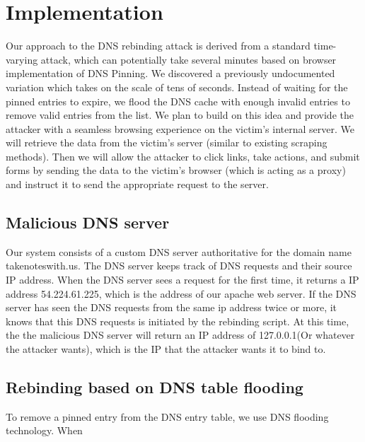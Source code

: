 \section{Implementation}
\label{sec:impl}

Our approach to the DNS rebinding attack is derived from a standard time-varying attack, which can potentially take several minutes based on browser implementation of DNS Pinning. We discovered a previously undocumented variation which takes on the scale of tens of seconds. Instead of waiting for the pinned entries to expire, we flood the DNS cache with enough invalid entries to remove valid entries from the list. We plan to build on this idea and provide the attacker with a seamless browsing experience on the victim's internal server. We will retrieve the data from the victim's server (similar to existing scraping methods). Then we will allow the attacker to click links, take actions, and submit forms by sending the data to the victim's browser (which is acting as a proxy) and instruct it to send the appropriate request to the server.

\subsection{Malicious DNS server}
Our system consists of a custom DNS server authoritative for the domain name takenoteswith.us. The DNS server keeps track of DNS requests and their source IP address. When the DNS server sees a request for the first time, it returns a IP address 54.224.61.225, which is the address of our apache web server. If the DNS server has seen the DNS requests from the same ip address twice or more, it knows that this DNS requests is initiated by the rebinding script. At this time, the the malicious DNS server will return an IP address of 127.0.0.1(Or whatever the attacker wants), which is the IP that the attacker wants it to bind to.

\subsection{Rebinding based on DNS table flooding}
To remove a pinned entry from the DNS entry table, we use DNS flooding technology. When 
